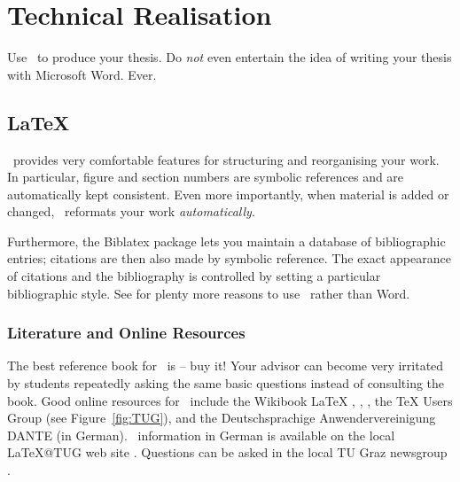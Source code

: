 %
%
% 
% 
% 


\chapter{Technical Realisation}

\label{chap:Tech}


Use \LaTeXe\ to produce your thesis. Do \emph{not} even entertain the
idea of writing your thesis with Microsoft Word. Ever.



\section{LaTeX}

\LaTeXe\ provides very comfortable features for structuring and
reorganising your work. In particular, figure and section numbers are
symbolic references and are automatically kept consistent. Even more
importantly, when material is added or changed, \LaTeXe\ reformats
your work \emph{automatically}.

Furthermore, the Biblatex package lets you maintain a database of
bibliographic entries; citations are then also made by symbolic
reference. The exact appearance of citations and the bibliography is
controlled by setting a particular bibliographic style.
See \textcite{WordProcessors} for plenty more reasons to use \LaTeXe\
rather than Word.



\subsection{Literature and Online Resources}

The best reference book for \LaTeXe\ is \textcite{KopkaDaly} -- buy it!
Your advisor can become very irritated by students repeatedly asking
the same basic questions instead of consulting the book.
%
Good online resources for \LaTeXe\ include the Wikibook LaTeX
\parencite{Wikibooks-latex}, \textcite{NotShortIntroLaTeX},
\textcite{FormattingInformation}, the TeX Users Group \parencite{TUG}
(see Figure~\ref{fig:TUG}), and the Deutschsprachige
Anwendervereinigung DANTE \parencite{DANTE} (in German).
%
\LaTeXe\ information in German is available on the local LaTeX@TUG web
site \parencite{LatexTUGraz}. Questions can be asked in the local TU Graz
newsgroup \news{tu-graz.latex}.



